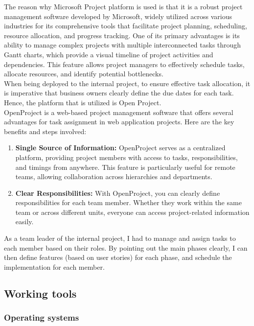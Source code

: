     The reason why Microsoft Project platform is used is that it is a robust project management software developed by Microsoft, widely utilized across various industries for its comprehensive tools that facilitate project planning, scheduling, resource allocation, and progress tracking. One of its primary advantages is its ability to manage complex projects with multiple interconnected tasks through Gantt charts, which provide a visual timeline of project activities and dependencies. This feature allows project managers to effectively schedule tasks, allocate resources, and identify potential bottlenecks. \cite{ms_project}\\

    
    When being deployed to the internal project, to ensure effective task allocation, it is imperative that business owners clearly define the due dates for each task. Hence, the platform that is utilized is Open Project. \\
    OpenProject is a web-based project management software that offers several advantages for task assignment in web application projects. Here are the key benefits and steps involved:
    \begin{enumerate}
        \item \textbf{Single Source of Information:} OpenProject serves as a centralized platform, providing project members with access to tasks, responsibilities, and timings from anywhere. This feature is particularly useful for remote teams, allowing collaboration across hierarchies and departments. \cite{why_openproject}

        \item \textbf{Clear Responsibilities:} With OpenProject, you can clearly define responsibilities for each team member. Whether they work within the same team or across different units, everyone can access project-related information easily.
    \end{enumerate}
    \noindent As a team leader of the internal project, I had to manage and assign tasks to each member based on their roles. By pointing out the main phases clearly, I can then define features (based on user stories) for each phase, and schedule the implementation for each member.

    
    

\subsection{Working tools}
    \subsubsection{Operating systems}


